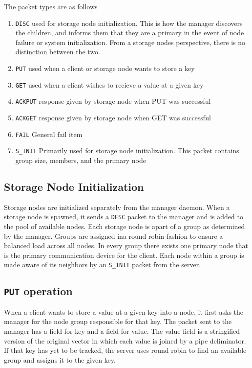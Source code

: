 \documentclass{article}
\begin{document}
The packet types are as follows
\begin{enumerate}
    \item \texttt{DISC}
    \subitem used for storage node initialization. This is how the manager discovers the children, and informs them that they are a primary in the event of node 
    failure or system initialization. From a storage nodes perspective, there is no distinction between the two.
    \item \texttt{PUT}
    \subitem used when a client or storage node wants to store a key
    \item \texttt{GET}
    \subitem used when a client wishes to recieve a value at a given key
    \item \texttt{ACKPUT}
    \subitem response given by storage node when PUT was successful
    \item \texttt{ACKGET}
    \subitem response given by storage node when GET was successful
    \item \texttt{FAIL}
    \subitem General fail item
    \item \texttt{S\_INIT}
    \subitem Primarily used for storage node initialization. This packet contains group size, members, and the primary node
\end{enumerate}

\subsection{Storage Node Initialization}
Storage nodes are initialized separately from the manager daemon.
When a storage node is spawned, it sends a \texttt{DESC} packet to the manager and is added to the pool of available nodes.
Each storage node is apart of a group as determined by the manager.
Groups are assigned ina round robin fashion to ensure a balanced load across all nodes.
In every group there exists one primary node that is the primary communication device for the client.
Each node within a group is made aware of its neighbors by an \texttt{S\_INIT} packet from the server.

\subsection{\texttt{PUT} operation}
When a client wants to store a value at a given key into a node, it first asks the manager for the node group responsible for that key.
The packet sent to the manager has a field for key and a field for value.
The value field is a stringified version of the original vector in which each value is joined by a pipe deliminator.
If that key has yet to be tracked, the server uses round robin to find an available group and assigns it to the given key.
\end{document}
